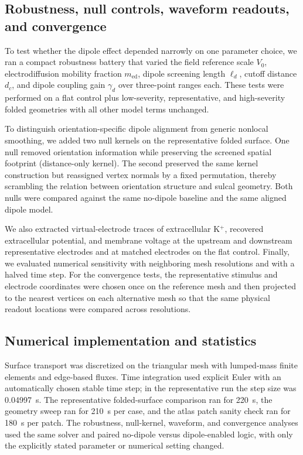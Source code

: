 \documentclass[12pt]{article}
\begin{document}
\subsection{Robustness, null controls, waveform readouts, and convergence}

To test whether the dipole effect depended narrowly on one parameter choice, we ran a compact robustness battery that varied the field reference scale $V_0$, electrodiffusion mobility fraction $m_{\mathrm{ed}}$, dipole screening length $\ell_d$, cutoff distance $d_c$, and dipole coupling gain $\gamma_d$ over three-point ranges each. These tests were performed on a flat control plus low-severity, representative, and high-severity folded geometries with all other model terms unchanged.

To distinguish orientation-specific dipole alignment from generic nonlocal smoothing, we added two null kernels on the representative folded surface. One null removed orientation information while preserving the screened spatial footprint (distance-only kernel). The second preserved the same kernel construction but reassigned vertex normals by a fixed permutation, thereby scrambling the relation between orientation structure and sulcal geometry. Both nulls were compared against the same no-dipole baseline and the same aligned dipole model.

We also extracted virtual-electrode traces of extracellular K$^+$, recovered extracellular potential, and membrane voltage at the upstream and downstream representative electrodes and at matched electrodes on the flat control. Finally, we evaluated numerical sensitivity with neighboring mesh resolutions and with a halved time step. For the convergence tests, the representative stimulus and electrode coordinates were chosen once on the reference mesh and then projected to the nearest vertices on each alternative mesh so that the same physical readout locations were compared across resolutions.

\subsection{Numerical implementation and statistics}

Surface transport was discretized on the triangular mesh with lumped-mass finite elements and edge-based fluxes. Time integration used explicit Euler with an automatically chosen stable time step; in the representative run the step size was 0.04997~s. The representative folded-surface comparison ran for 220~s, the geometry sweep ran for 210~s per case, and the atlas patch sanity check ran for 180~s per patch. The robustness, null-kernel, waveform, and convergence analyses used the same solver and paired no-dipole versus dipole-enabled logic, with only the explicitly stated parameter or numerical setting changed.
\end{document}
